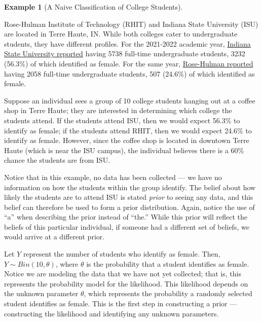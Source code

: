 \documentclass[
  letterpaper,
  DIV=11,
  numbers=noendperiod]{scrreprt}
\theoremstyle{definition}
\theoremstyle{plain}
\theoremstyle{definition}
\newtheorem{example}{Example}[chapter]
\theoremstyle{remark}
\begin{document}
\begin{example}[A Naive Classification of College
Students]\protect\hypertarget{exm-naive}{}\label{exm-naive}

Rose-Hulman Institute of Technology (RHIT) and Indiana State University
(ISU) are located in Terre Haute, IN. While both colleges cater to
undergraduate students, they have different profiles. For the 2021-2022
academic year,
\href{https://irt2.indstate.edu/cms7/ir/assets/File/CDS22.pdf}{Indiana
State University reported} having 5738 full-time undergraduate students,
3232 (56.3\%) of which identified as female. For the same year,
\href{https://www.rose-hulman.edu/academics/academic-affairs/irpa/reports/CDS_AY_2021-22.pdf}{Rose-Hulman
reported} having 2058 full-time undergraduate students, 507 (24.6\%) of
which identified as female.

Suppose an individual sees a group of 10 college students hanging out at
a coffee shop in Terre Haute; they are interested in determining which
college the students attend. If the students attend ISU, then we would
expect 56.3\% to identify as female; if the students attend RHIT, then
we would expect 24.6\% to identify as female. However, since the coffee
shop is located in downtown Terre Haute (which is near the ISU campus),
the individual believes there is a 60\% chance the students are from
ISU.

\end{example}

Notice that in this example, no data has been collected --- we have no
information on how the students within the group identify. The belief
about how likely the students are to attend ISU is stated \emph{prior}
to seeing any data, and this belief can therefore be used to form a
prior distribution. Again, notice the use of ``a'' when describing the
prior instead of ``the.'' While this prior will reflect the beliefs of
this particular individual, if someone had a different set of beliefs,
we would arrive at a different prior.

Let \(Y\) represent the number of students who identify as female. Then,
\(Y \sim Bin(10, \theta)\), where \(\theta\) is the probability that a
student identifies as female. Notice we are modeling the data that we
have not yet collected; that is, this represents the probability model
for the likelihood. This likelihood depends on the unknown parameter
\(\theta\), which represents the probability a randomly selected student
identifies as female. This is the first step in constructing a prior ---
constructing the likelihood and identifying any unknown parameters.
\end{document}

